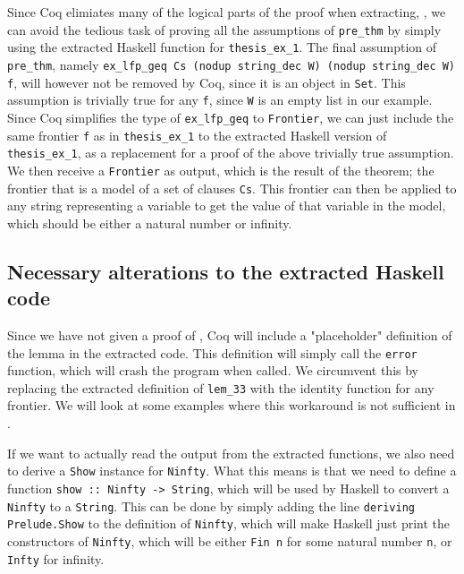 Since Coq elimiates many of the logical parts of the proof when extracting,
\cite[p. ~8]{coqextroverview},
we can avoid the tedious task of proving all the assumptions of \lstinline{pre_thm} by simply
using the extracted Haskell function for \lstinline{thesis_ex_1}.
The final assumption of \lstinline{pre_thm}, namely \lstinline{ex_lfp_geq Cs (nodup string_dec W) (nodup string_dec W) f},
will however not be removed by Coq, since it is an object in \lstinline{Set}.
This assumption is trivially true for any \lstinline{f}, since \lstinline{W} is an empty list in our example.
Since Coq simplifies the type of \lstinline{ex_lfp_geq} to \lstinline{Frontier},
we can just include the same frontier \lstinline{f} as in \lstinline{thesis_ex_1} to the extracted Haskell
version of \lstinline{thesis_ex_1}, as a replacement for a proof of the above trivially true assumption.
We then receive a \lstinline{Frontier} as output, which is the result of the theorem;
the frontier that is a model of a set of clauses \lstinline{Cs}.
This frontier can then be applied to any string representing a variable to get the value of that variable in the model,
which should be either a natural number or infinity.

\subsection{Necessary alterations to the extracted Haskell code}
\label{sec:necessary_alterations}

Since we have not given a proof of , Coq will include a "placeholder" definition of the lemma in the extracted code.
This definition will simply call the \lstinline{error} function, which will crash the program when called.
We circumvent this by replacing the extracted definition of \lstinline{lem_33} with the identity function
for any frontier. We will look at some examples where this workaround is not sufficient in
.

If we want to actually read the output from the extracted functions, we also need to
derive a \lstinline{Show} instance for \lstinline{Ninfty}.
What this means is that we need to define a function \lstinline{show :: Ninfty -> String},
which will be used by Haskell to convert a \lstinline{Ninfty} to a \lstinline{String}.
This can be done by simply adding the line \lstinline{deriving Prelude.Show} to the definition of \lstinline{Ninfty},
which will make Haskell just print the constructors of \lstinline{Ninfty},
which will be either \lstinline{Fin n} for some natural number \lstinline{n},
or \lstinline{Infty} for infinity.

